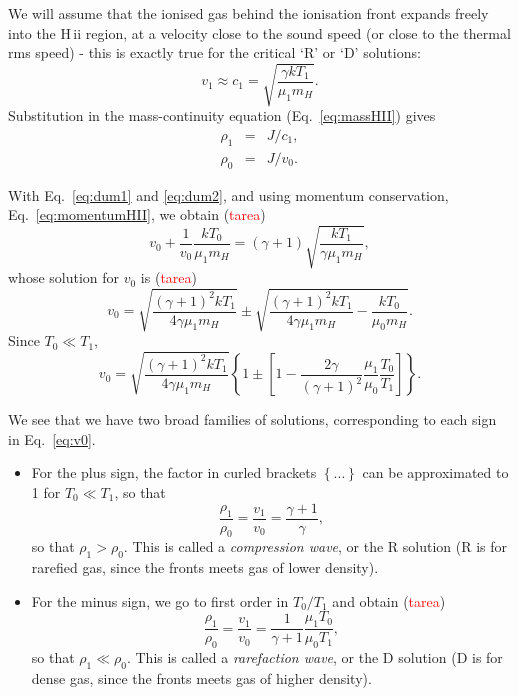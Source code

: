 
We will assume that the ionised gas behind the ionisation front
expands freely into the H\,{\sc ii} region, at a velocity close to the
sound speed (or close to the thermal rms speed) - this is exactly true
for the critical `R' or `D' solutions:
\[
v_1 \approx c_1 = \sqrt{ \frac{ \gamma k T_1  }{\mu_1 m_H}}.
\]
Substitution in the mass-continuity equation (Eq.~\ref{eq:massHII})
gives
\begin{eqnarray}
\rho_1 &  =  & J / c_1, \label{eq:dum1} \\
\rho_0  &  =  & J / v_0. \label{eq:dum2}
\end{eqnarray}



With Eq.~\ref{eq:dum1} and \ref{eq:dum2}, and using momentum
conservation, Eq.~\ref{eq:momentumHII}, we obtain
(\textcolor{red}{tarea}) 
\begin{equation}
v_0 + \frac{1}{v_0} \frac{k T_0}{\mu_1 m_H} = (\gamma + 1) \sqrt{ \frac{k
  T_1}{\gamma \mu_1 m_H} },
\end{equation}
whose solution for $v_0$ is (\textcolor{red}{tarea}) 
\begin{equation}
v_0 = \sqrt{ \frac{ (\gamma + 1)^2 k T_1   }{ 4 \gamma \mu_1 m_H  }  }
\pm \sqrt{  \frac{ (\gamma + 1)^2 k T_1 }{ 4 \gamma \mu_1 m_H}  -
  \frac{ k T_0 }{\mu_0 m_H} }.
\end{equation}
Since $T_0 \ll T_1$, 
\begin{equation}
v_0 = \sqrt{ \frac{ (\gamma + 1)^2 k T_1   }{ 4 \gamma \mu_1 m_H  }  }
\left\{   1 \pm  \left[ 1 -  \frac{ 2 \gamma}{ (\gamma + 1)^2 }
    \frac{\mu_1}{\mu_0} \frac{T_0}{T_1}  \right] \right\}. \label{eq:v0}
\end{equation}



We see that we have two broad families of solutions, corresponding to
each sign in Eq.~\ref{eq:v0}. 
\begin{itemize}
\item For the plus sign, the factor in curled brackets $\left\{
... \right\}$ can be approximated to 1 for $T_0 \ll T_1$, so that 
\[ 
\frac{\rho_1}{\rho_0} = \frac{v_1}{v_0} = \frac{\gamma + 1}{\gamma}, 
\] 
so that $\rho_1 > \rho_0$. This is called a {\em compression wave}, or
the R solution (R is for rarefied gas, since the fronts meets gas of
lower density). 

\item For the minus sign, we go to first order in $T_0/T_1$ and obtain 
(\textcolor{red}{tarea})
\[ 
\frac{\rho_1}{\rho_0} = \frac{v_1}{v_0} = \frac{1}{\gamma + 1}
\frac{\mu_1 T_0}{\mu_0 T_1},
\] 
so that $\rho_1 \ll \rho_0$. This is called a {\em rarefaction wave},
or the D solution (D is for dense gas, since the fronts meets gas of
higher density).
\end{itemize}

